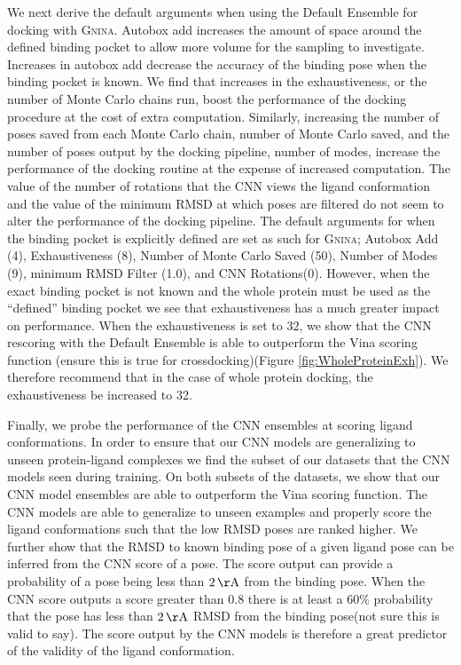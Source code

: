 \documentclass[journal=jcisd8,manuscript=article]{achemso}
\begin{document}
We next derive the default arguments when using the Default Ensemble for docking with \textsc{Gnina}. Autobox add increases the amount of space around the defined binding pocket to allow more volume for the sampling to investigate. Increases in autobox add decrease the accuracy of the binding pose when the binding pocket is known. We find that increases in the exhaustiveness, or the number of Monte Carlo chains run, boost the performance of the docking procedure at the cost of extra computation. Similarly, increasing the number of poses saved from each Monte Carlo chain, number of Monte Carlo saved, and the number of poses output by the docking pipeline, number of modes, increase the performance of the docking routine at the expense of increased computation. The value of the number of rotations that the CNN views the ligand conformation and the value of the minimum RMSD at which poses are filtered do not seem to alter the performance of the docking pipeline. The default arguments for when the binding pocket is explicitly defined are set as such for \textsc{Gnina}; Autobox Add (4), Exhaustiveness (8), Number of Monte Carlo Saved (50), Number of Modes (9), minimum RMSD Filter (1.0), and CNN Rotations(0). However, when the exact binding pocket is not known and the whole protein must be used as the ``defined'' binding pocket we see that exhaustiveness has a much greater impact on performance. When the exhaustiveness is set to $32$, we show that the CNN rescoring with the Default Ensemble is able to outperform the Vina scoring function (ensure this is true for crossdocking)(Figure \ref{fig:WholeProteinExh}). We therefore recommend that in the case of whole protein docking, the exhaustiveness be increased to 32.

Finally, we probe the performance of the CNN ensembles at scoring ligand conformations. In order to ensure that our CNN models are generalizing to unseen protein-ligand complexes we find the subset of our datasets that the CNN models seen during training. On both subsets of the datasets, we show that our CNN model ensembles are able to outperform the Vina scoring function. The CNN models are able to generalize to unseen examples and properly score the ligand conformations such that the low RMSD poses are ranked higher. We further show that the RMSD to known binding pose of a given ligand pose can be inferred from the CNN score of a pose. The score output can provide a probability of a pose being less than $2\,\mathrm{\AA}$ from the binding pose. When the CNN score outputs a score greater than $0.8$ there is at least a $60\%$ probability that the pose has less than $2\,\mathrm{\AA}$ RMSD from the binding pose(not sure this is valid to say). The score output by the CNN models is therefore a great predictor of the validity of the ligand conformation.
\end{document}
